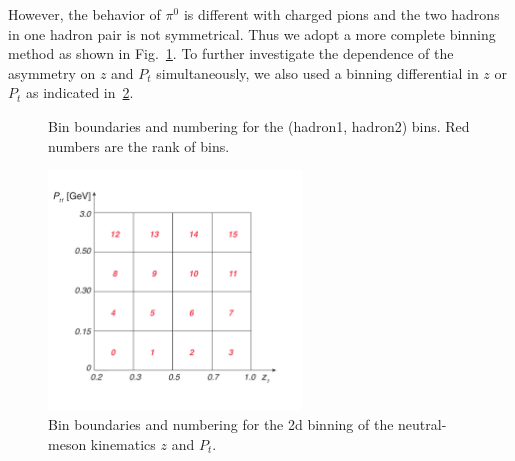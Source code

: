 However, the behavior of $\pi^0$ is different with charged pions and the two hadrons in one hadron pair is not symmetrical. Thus we adopt a more complete binning method as shown in Fig.~\ref{fig:binnings}. To further investigate the dependence of the asymmetry on $z$ and $P_t$ simultaneously, we also used a binning differential in $z$ or $P_t$ as indicated in~\ref{fig:zptbin}.   
\begin{figure}[H]
\captionsetup[subfloat]{farskip=2pt,captionskip=1pt}
\centering
{}
\caption{Bin boundaries and numbering for the (hadron1, hadron2) bins. Red numbers are the rank of bins.}
\label{fig:binnings}
\end{figure}

\begin{figure}[H]
    \centering
    \includegraphics[width=0.6\textwidth,natwidth=250,natheight=100]{figure_dataselection/zptbin.pdf}
    \caption{Bin boundaries and numbering for the 2d binning of the neutral-meson kinematics $z$ and $P_t$.}
    \label{fig:zptbin}
\end{figure}


